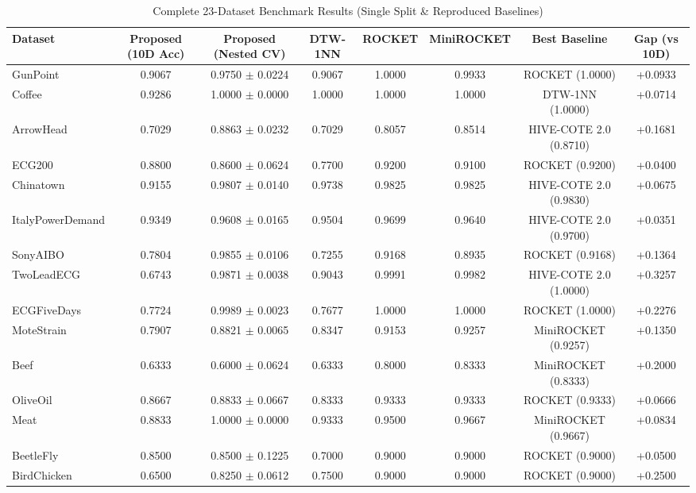 \documentclass[conference]{IEEEtran}
\begin{document}
\begin{table}[htbp]
\caption{Complete 23-Dataset Benchmark Results (Single Split \& Reproduced Baselines)}
\label{tab:complete_23_results}
\centering
\begin{tabular}{|l|c|c|c|c|c|c|c|}
\hline
Dataset & Proposed (10D Acc) & Proposed (Nested CV) & DTW-1NN & ROCKET & MiniROCKET & Best Baseline & Gap (vs 10D) \\ \hline
GunPoint & 0.9067 & 0.9750 $\pm$ 0.0224 & 0.9067 & 1.0000 & 0.9933 & ROCKET (1.0000) & +0.0933 \\ \hline
Coffee & 0.9286 & 1.0000 $\pm$ 0.0000 & 1.0000 & 1.0000 & 1.0000 & DTW-1NN (1.0000) & +0.0714 \\ \hline
ArrowHead & 0.7029 & 0.8863 $\pm$ 0.0232 & 0.7029 & 0.8057 & 0.8514 & HIVE-COTE 2.0 (0.8710) & +0.1681 \\ \hline
ECG200 & 0.8800 & 0.8600 $\pm$ 0.0624 & 0.7700 & 0.9200 & 0.9100 & ROCKET (0.9200) & +0.0400 \\ \hline
Chinatown & 0.9155 & 0.9807 $\pm$ 0.0140 & 0.9738 & 0.9825 & 0.9825 & HIVE-COTE 2.0 (0.9830) & +0.0675 \\ \hline
ItalyPowerDemand & 0.9349 & 0.9608 $\pm$ 0.0165 & 0.9504 & 0.9699 & 0.9640 & HIVE-COTE 2.0 (0.9700) & +0.0351 \\ \hline
SonyAIBO & 0.7804 & 0.9855 $\pm$ 0.0106 & 0.7255 & 0.9168 & 0.8935 & ROCKET (0.9168) & +0.1364 \\ \hline
TwoLeadECG & 0.6743 & 0.9871 $\pm$ 0.0038 & 0.9043 & 0.9991 & 0.9982 & HIVE-COTE 2.0 (1.0000) & +0.3257 \\ \hline
ECGFiveDays & 0.7724 & 0.9989 $\pm$ 0.0023 & 0.7677 & 1.0000 & 1.0000 & ROCKET (1.0000) & +0.2276 \\ \hline
MoteStrain & 0.7907 & 0.8821 $\pm$ 0.0065 & 0.8347 & 0.9153 & 0.9257 & MiniROCKET (0.9257) & +0.1350 \\ \hline
Beef & 0.6333 & 0.6000 $\pm$ 0.0624 & 0.6333 & 0.8000 & 0.8333 & MiniROCKET (0.8333) & +0.2000 \\ \hline
OliveOil & 0.8667 & 0.8833 $\pm$ 0.0667 & 0.8333 & 0.9333 & 0.9333 & ROCKET (0.9333) & +0.0666 \\ \hline
Meat & 0.8833 & 1.0000 $\pm$ 0.0000 & 0.9333 & 0.9500 & 0.9667 & MiniROCKET (0.9667) & +0.0834 \\ \hline
BeetleFly & 0.8500 & 0.8500 $\pm$ 0.1225 & 0.7000 & 0.9000 & 0.9000 & ROCKET (0.9000) & +0.0500 \\ \hline
BirdChicken & 0.6500 & 0.8250 $\pm$ 0.0612 & 0.7500 & 0.9000 & 0.9000 & ROCKET (0.9000) & +0.2500 \\ \hline

\end{tabular}
\end{table}
\end{document}
